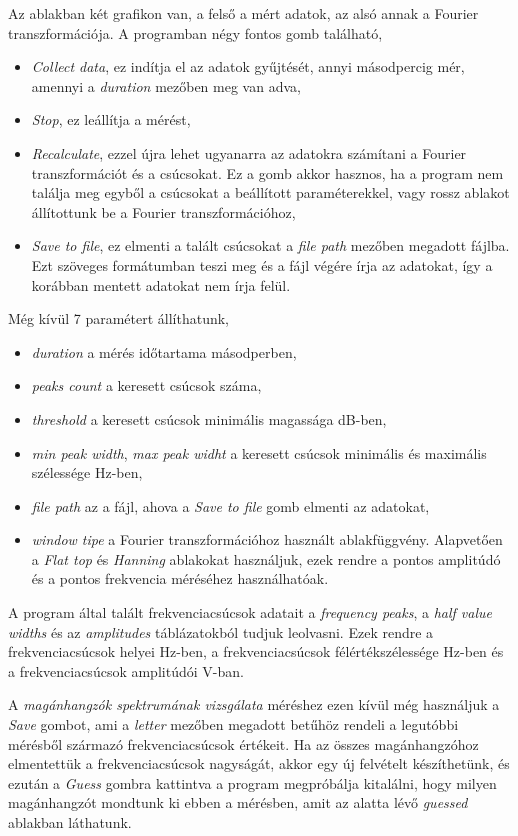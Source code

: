 \documentclass[a4paper,12pt]{article}
\begin{document}
Az ablakban két grafikon van, a felső a mért adatok, az alsó annak a Fourier transzformációja. A programban négy fontos gomb található,
\begin{itemize}
\item \emph{Collect data}, ez indítja el az adatok gyűjtését, annyi másodpercig mér, amennyi a \emph{duration} mezőben meg van adva,
\item \emph{Stop}, ez leállítja a mérést,
\item \emph{Recalculate}, ezzel újra lehet ugyanarra az adatokra számítani a Fourier transzformációt és a csúcsokat. Ez a gomb akkor hasznos, ha a program nem találja meg egyből a csúcsokat a beállított paraméterekkel, vagy rossz ablakot állítottunk be a Fourier transzformációhoz,
\item \emph{Save to file}, ez elmenti a talált csúcsokat a \emph{file path} mezőben megadott fájlba. Ezt szöveges formátumban teszi meg és a fájl végére írja az adatokat, így a korábban mentett adatokat nem írja felül.
\end{itemize}
Még kívül 7 paramétert állíthatunk,
\begin{itemize}
\item \emph{duration} a mérés időtartama másodperben,
\item \emph{peaks count} a keresett csúcsok száma,
\item \emph{threshold} a keresett csúcsok minimális magassága dB-ben,
\item \emph{min peak width}, \emph{max peak widht} a keresett csúcsok minimális és maximális szélessége Hz-ben,
\item \emph{file path} az a fájl, ahova a \emph{Save to file} gomb elmenti az adatokat,
\item \emph{window tipe} a Fourier transzformációhoz használt ablakfüggvény. Alapvetően a \emph{Flat top} és \emph{Hanning} ablakokat használjuk, ezek rendre a pontos amplitúdó és a pontos frekvencia méréséhez használhatóak.
\end{itemize}

A program által talált frekvenciacsúcsok adatait a \emph{frequency peaks}, a \emph{half value widths} és az \emph{amplitudes} táblázatokból tudjuk leolvasni. Ezek rendre a frekvenciacsúcsok helyei Hz-ben, a frekvenciacsúcsok félértékszélessége Hz-ben és a frekvenciacsúcsok amplitúdói V-ban.

A \emph{magánhangzók spektrumának vizsgálata} méréshez ezen kívül még használjuk a \emph{Save} gombot, ami a \emph{letter} mezőben megadott betűhöz rendeli a legutóbbi mérésből származó frekvenciacsúcsok értékeit. Ha az összes magánhangzóhoz elmentettük a frekvenciacsúcsok nagyságát, akkor egy új felvételt készíthetünk, és ezután a \emph{Guess} gombra kattintva a program megpróbálja kitalálni, hogy milyen magánhangzót mondtunk ki ebben a mérésben, amit az alatta lévő \emph{guessed} ablakban láthatunk.
\end{document}

